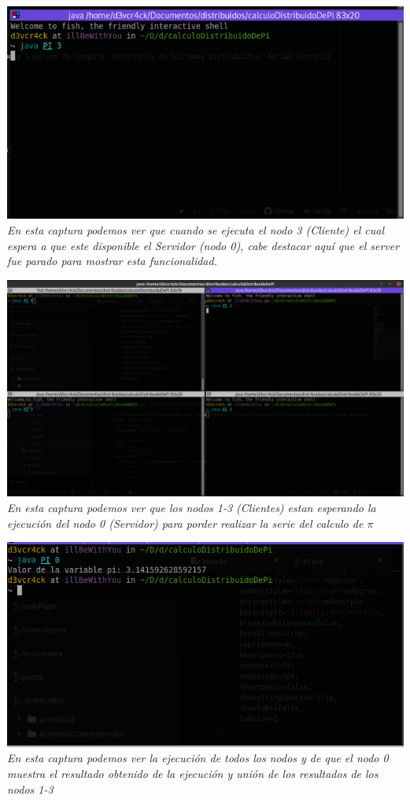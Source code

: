 \documentclass[10pt,executivepaper]{article}
\begin{document}
\begin{center}
  \\
  \includegraphics[scale=0.5]{imgs/client-wait.png}
  \\\textit{En esta captura podemos ver que cuando se ejecuta el nodo 3 (Cliente) el cual espera a que este disponible el Servidor (nodo 0), cabe destacar aquí que el server fue parado para mostrar esta funcionalidad.}
  \begin{landscape}
    \includegraphics[scale=0.5]{imgs/all-clients-wait-for-server.png}
    \\\textit{En esta captura podemos ver que los nodos 1-3 (Clientes) estan esperando la ejecución del nodo 0 (Servidor) para porder realizar la serie del calculo de $\pi$}\\
  \end{landscape}
  \includegraphics[scale=0.5]{imgs/serverRun-and-exit-when-the-clients-run.png}
  \\\textit{En esta captura podemos ver la ejecución de todos los nodos y de que el nodo 0 muestra el resultado obtenido de la ejecución y unión de los resultados de los nodos 1-3}
\end{center}
\end{document}

